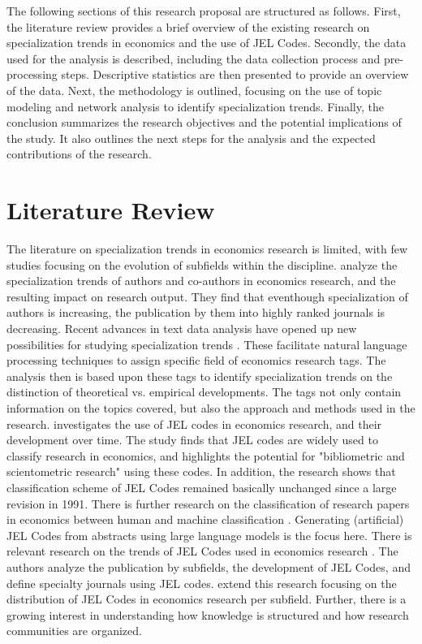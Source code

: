 \documentclass[11pt, a4paper, leqno]{article}
\begin{document}
The following sections of this research proposal are structured as follows.
First, the literature review provides a brief overview of the existing research on specialization trends in economics and the use of JEL Codes.
Secondly, the data used for the analysis is described, including the data collection process and pre-processing steps.
Descriptive statistics are then presented to provide an overview of the data.
Next, the methodology is outlined, focusing on the use of topic modeling and network analysis to identify specialization trends.
Finally, the conclusion summarizes the research objectives and the potential implications of the study.
It also outlines the next steps for the analysis and the expected contributions of the research.

\section{Literature Review}
The literature on specialization trends in economics research is limited, with few studies focusing on the evolution of subfields within the discipline.
\citet{onder2021} analyze the specialization trends of authors and co-authors in economics research, and the resulting impact on research output.
They find that eventhough specialization of authors is increasing, the publication by them into highly ranked journals is decreasing.
Recent advances in text data analysis have opened up new possibilities for studying specialization trends \citep{anauati2016, angrist2017, angrist2020, galiani2023a}.
These facilitate natural language processing techniques to assign specific field of economics research tags.
The analysis then is based upon these tags to identify specialization trends on the distinction of theoretical vs. empirical developments.
The tags not only contain information on the topics covered, but also the approach and methods used in the research.
\citet{heikkila2022a} investigates the use of JEL codes in economics research, and their development over time.
The study finds that JEL codes are widely used to classify research in economics, and highlights the potential for "bibliometric and scientometric research" using these codes.
In addition, the research shows that classification scheme of JEL Codes remained basically unchanged since a large revision in 1991.
There is further research on the classification of research papers in economics between human and machine classification \citep{heikkila2024}.
Generating (artificial) JEL Codes from abstracts using large language models is the focus here.
There is relevant research on the trends of JEL Codes used in economics research \citep{kelly2011}.
The authors analyze the publication by subfields, the development of JEL Codes, and define specialty journals using JEL codes.
\citet{rath2016} extend this research focusing on the distribution of JEL Codes in economics research per subfield.
Further, there is a growing interest in understanding how knowledge is structured and how research communities are organized.
\end{document}
